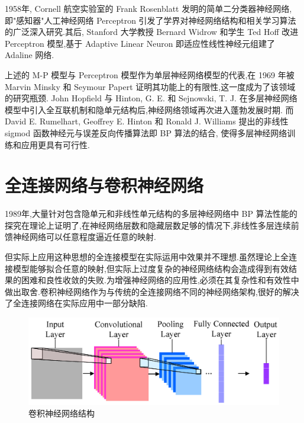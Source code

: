1958年, Cornell 航空实验室的 Frank Rosenblatt 发明的简单二分类器神经网络,即"感知器"人工神经网络 Perceptron 引发了学界对神经网络结构和相关学习算法的广泛深入研究.其后, Stanford 大学教授 Bernard Widrow 和学生 Ted Hoff 改进Perceptron 模型,基于 Adaptive Linear Neuron 即适应性线性神经元组建了 Adaline 网络.

上述的 M-P 模型与 Perceptron 模型作为单层神经网络模型的代表,在 1969 年被 Marvin Minsky 和 Seymour Papert 证明其功能上的有限性,这一度成为了该领域的研究瓶颈. John Hopfield 与 Hinton, G. E. 和 Sejnowski, T. J. 在多层神经网络模型中引入全互联机制和隐单元结构后,神经网络领域再次进入蓬勃发展时期. 而 David E. Rumelhart, Geoffrey E. Hinton 和 Ronald J. Williams 提出的非线性 sigmod 函数神经元与误差反向传播算法即 BP 算法的结合, 使得多层神经网络训练和应用更具有可行性.

\section{全连接网络与卷积神经网络}

1989年,大量针对包含隐单元和非线性单元结构的多层神经网络中 BP 算法性能的探究在理论上证明了,在神经网络层数和隐藏层数足够的情况下,非线性多层连续前馈神经网络可以任意程度逼近任意的映射.

但实际上应用这种思想的全连接模型在实际运用中效果并不理想.虽然理论上全连接模型能够拟合任意的映射,但实际上过度复杂的神经网络结构会造成得到有效结果的困难和良性收敛的失败.为增强神经网络的应用性,必须在其复杂性和有效性中做出取舍.卷积神经网络作为与传统的全连接网络不同的神经网络架构,很好的解决了全连接网络在实际应用中一部分缺陷.

\begin{figure}
\centering
\includegraphics[scale=1]{Figures/CNN3.png}
\caption{卷积神经网络结构}
\end{figure}

